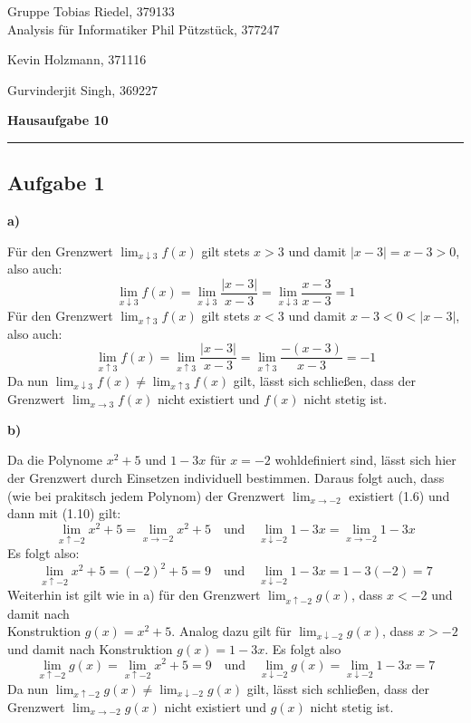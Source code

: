\documentclass[a4paper,graphics,11pt]{article}
\newcommand{\aufgabe}[1]{\subsection*{Aufgabe #1}}
\begin{document}
\noindent Gruppe              \hfill Tobias Riedel, 379133 \\
\noindent Analysis für Informatiker             \hfill Phil Pützstück, 377247 \\
\strut\hfill Kevin Holzmann, 371116\\
\strut\hfill Gurvinderjit Singh, 369227
\begin{center}
	\LARGE{\textbf{Hausaufgabe 10}}
\end{center}
\begin{center}
\rule[0.1ex]{\textwidth}{1pt}
\end{center}



\aufgabe{1}
\textbf{a)}

Für den Grenzwert $\lim_{x \downarrow 3}\limits f(x)$ gilt stets $x > 3$ und damit
$|x-3| = x-3 > 0$, also auch:
$$
    \lim_{x \downarrow 3} f(x)
    = \lim_{x \downarrow 3} \frac{|x-3|}{x-3}
    = \lim_{x \downarrow 3} \frac{x-3}{x-3}
    = 1
$$
Für den Grenzwert $\lim_{x \uparrow 3}\limits f(x)$ gilt stets $x < 3$ und damit
$x-3 < 0 < |x-3|$, also auch:
$$
    \lim_{x \uparrow 3} f(x)
    = \lim_{x \uparrow 3} \frac{|x-3|}{x-3}
    = \lim_{x \uparrow 3} \frac{-(x-3)}{x-3}
    = -1
$$
Da nun $\lim_{x \downarrow 3}\limits f(x) \neq \lim_{x \uparrow 3}\limits f(x)$ gilt,
lässt sich schließen, dass der Grenzwert $\lim_{x \to 3}\limits f(x)$ nicht existiert und
$f(x)$ nicht stetig ist.

\textbf{b)}

Da die Polynome $x^2+5$ und $1-3x$ für $x = -2$ wohldefiniert sind, lässt sich hier der
Grenzwert durch Einsetzen individuell bestimmen. Daraus folgt auch, dass (wie bei prakitsch
jedem Polynom) der Grenzwert $\lim_{x \to -2}$ existiert (1.6) und dann mit (1.10) gilt:
$$ \lim_{x \uparrow -2} x^2+5 = \lim_{x \to -2} x^2+5
    \quad\text{und}\quad
    \lim_{x \downarrow -2} 1-3x = \lim_{x \to -2} 1-3x
$$
Es folgt also:
$$
    \lim_{x \uparrow -2} x^2+5 = (-2)^2+5 = 9
    \quad\text{und}\quad
    \lim_{x \downarrow -2} 1-3x = 1-3(-2) = 7
$$
Weiterhin ist gilt wie in a) für den Grenzwert $\lim_{x \uparrow -2}\limits g(x)$, dass $x<-2$
und damit nach\\
Konstruktion $g(x) = x^2+5$. Analog dazu gilt für $\lim_{x \downarrow -2}\limits g(x)$,
dass $x>-2$ und damit nach Konstruktion $g(x) = 1-3x$. Es folgt also
$$
    \lim_{x \uparrow -2} g(x) = \lim_{x \uparrow -2} x^2+5 = 9
    \quad\text{und}\quad
    \lim_{x \downarrow -2} g(x) = \lim_{x \downarrow -2} 1-3x = 7
$$
Da nun $\lim_{x \uparrow -2}\limits g(x) \neq \lim_{x \downarrow -2}\limits g(x)$ gilt,
lässt sich schließen, dass der Grenzwert $\lim_{x \to -2}\limits g(x)$ nicht existiert und
$g(x)$ nicht stetig ist.
\newpage
\end{document}
